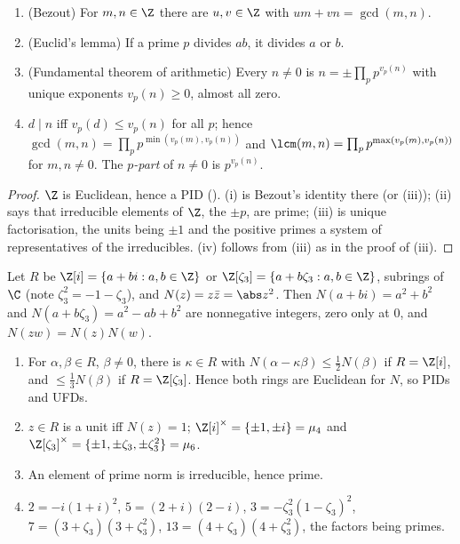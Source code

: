 \begin{proposition}\label{prop:rings:integers}
\begin{enumerate}[label=(\roman*)]
\item (Bezout) For $m,n\in\Z$ there are $u,v\in\Z$ with $um+vn=\gcd(m,n)$.
\item (Euclid's lemma) If a prime $p$ divides $ab$, it divides $a$ or $b$.
\item (Fundamental theorem of arithmetic) Every $n\ne0$ is $n=\pm\prod_pp^{v_p(n)}$ with unique exponents $v_p(n)\ge0$, almost all zero.
\item $d\mid n$ iff $v_p(d)\le v_p(n)$ for all $p$; hence $\gcd(m,n)=\prod_pp^{\min(v_p(m),v_p(n))}$ and $\lcm(m,n)=\prod_pp^{\max(v_p(m),v_p(n))}$ for
$m,n\ne0$. The \emph{$p$-part} of $n\ne0$ is $p^{v_p(n)}$.
\end{enumerate}
\end{proposition}

\begin{proof}
$\Z$ is Euclidean, hence a PID (). (i) is Bezout's identity there (or (iii)); (ii) says
that irreducible elements of $\Z$, the $\pm p$, are prime; (iii) is unique factorisation, the units being $\pm1$ and the positive
primes a system of representatives of the irreducibles. (iv) follows from (iii) as in the proof of (iii).
\end{proof}

\begin{theorem}\label{thm:rings:gauss-eisenstein-integers}
Let $R$ be $\Z[i]=\{a+bi:a,b\in\Z\}$ or $\Z[\zeta_3]=\{a+b\zeta_3:a,b\in\Z\}$, subrings of $\C$ (note $\zeta_3^2=-1-\zeta_3$), and $N(z)=z\bar z=\abs z^2$.
Then $N(a+bi)=a^2+b^2$ and $N(a+b\zeta_3)=a^2-ab+b^2$ are nonnegative integers, zero only at $0$, and $N(zw)=N(z)N(w)$.
\begin{enumerate}[label=(\roman*)]
\item For $\alpha,\beta\in R$, $\beta\ne0$, there is $\kappa\in R$ with $N(\alpha-\kappa\beta)\le\frac12N(\beta)$ if $R=\Z[i]$, and $\le\frac13N(\beta)$ if $R=\Z[\zeta_3]$.
Hence both rings are Euclidean for $N$, so PIDs and UFDs.
\item $z\in R$ is a unit iff $N(z)=1$; $\Z[i]^\times=\{\pm1,\pm i\}=\mu_4$ and $\Z[\zeta_3]^\times=\{\pm1,\pm\zeta_3,\pm\zeta_3^2\}=\mu_6$.
\item An element of prime norm is irreducible, hence prime.
\item $2=-i(1+i)^2$, $5=(2+i)(2-i)$, $3=-\zeta_3^2(1-\zeta_3)^2$, $7=(3+\zeta_3)(3+\zeta_3^2)$, $13=(4+\zeta_3)(4+\zeta_3^2)$, the factors being primes.
\end{enumerate}
\end{theorem}

